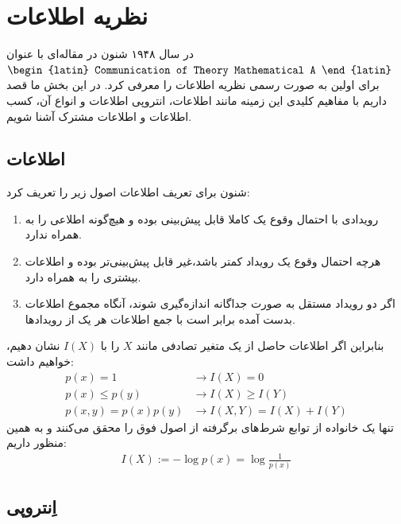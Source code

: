 \section{نظریه اطلاعات}
 در سال ۱۹۴۸ شنون در مقاله‌ای با عنوان 
\href{https://web.archive.org/web/19980715013250/http://cm.bell-labs.com/cm/ms/what/shannonday/shannon1948.pdf}{$\text{\begin{latin}
    Communication of Theory Mathematical A
\end{latin}}$}
برای اولین به صورت رسمی نظریه اطلاعات را معرفی کرد. در این بخش ما قصد داریم با مفاهیم کلیدی این زمینه مانند اطلاعات، انتروپی اطلاعات و انواع آن، کسب اطلاعات و اطلاعات مشترک آشنا شویم.

\subsection{اطلاعات}

شنون برای تعریف اطلاعات اصول زیر را تعریف کرد:
\begin{enumerate}
    \item  رویدادی با احتمال وقوع یک کاملا قابل پیش‌بینی بوده و هیچ‌گونه اطلاعی را به همراه ندارد.  
    \item هرچه احتمال وقوع یک رویداد کمتر باشد،غیر قابل پیش‌بینی‌تر بوده و اطلاعات بیشتری را به همراه دارد.
    \item اگر دو رویداد مستقل به صورت جداگانه اندازه‌گیری شوند، آنگاه مجموع اطلاعات بدست آمده برابر است با جمع اطلاعات هر یک از رویداد‌ها.
\end{enumerate}
بنابراین اگر اطلاعات حاصل از یک متغیر تصادفی مانند $X$ را با $I(X)$ نشان دهیم، خواهیم داشت:
\begin{align*}
    p(x) = 1 & \rightarrow I(X) = 0 \\
    p(x) \le p(y) & \rightarrow I(X) \ge I(Y) \\
    p(x,y) = p(x)p(y) &\rightarrow I(X,Y) = I(X) + I(Y) 
\end{align*}
تنها یک خانواده از توابع شرط‌های برگرفته از اصول فوق را محقق می‌کنند و به همین منظور داریم:
\begin{align*}
    I(X) := -\log p(x) = \log \frac{1}{p(x)}
\end{align*}

\subsection{اِنتروپی}

